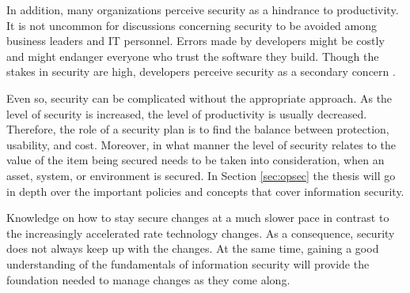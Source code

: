 In addition, many organizations perceive security as a hindrance to productivity. It is not uncommon for discussions concerning security to be avoided  among business leaders and IT personnel. Errors made by developers might be costly and might endanger everyone who trust the software they build. Though the stakes in security are high, developers perceive security as a secondary concern \cite{Lopez_2019}. 

Even so, security can be complicated without the appropriate approach. As the level of security is increased, the level of productivity is usually decreased. Therefore, the role of a security plan is to find the balance between protection, usability, and cost. Moreover, in what manner the level of security relates to the value of the item being secured needs to be taken into consideration, when an asset, system, or environment is secured. In Section \ref{sec:opsec} the thesis will go in depth over the important policies and concepts that cover information security.

Knowledge on how to stay secure changes at a much slower pace in contrast to the increasingly accelerated rate technology changes. As a consequence, security does not always keep up with the changes. At the same time, gaining a good understanding of the fundamentals of information security will provide the foundation needed to manage changes as they come along.
